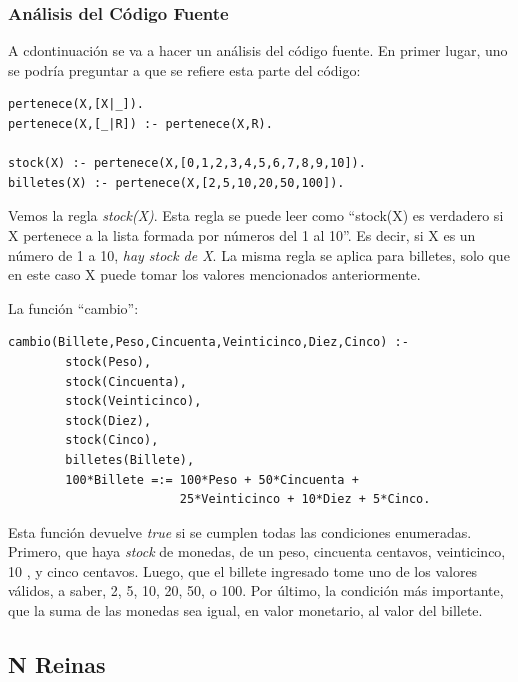 \documentclass[12pt,titlepage]{article}
\begin{document}
\subsubsection{Análisis del Código Fuente}

A cdontinuación se va a hacer un análisis del código fuente. En primer lugar, uno se podría preguntar a que se refiere esta parte del código:
\begin{lstlisting}
pertenece(X,[X|_]).
pertenece(X,[_|R]) :- pertenece(X,R).

stock(X) :- pertenece(X,[0,1,2,3,4,5,6,7,8,9,10]).
billetes(X) :- pertenece(X,[2,5,10,20,50,100]).
\end{lstlisting}

Vemos la regla \textit{stock(X)}. Esta regla se puede leer como ``stock(X) es verdadero si X pertenece a la lista formada por números del 1 al 10''. Es decir, si X es un número de 1 a 10, \textit{hay stock de X}. La misma regla se aplica para billetes, solo que en este caso X puede tomar los valores mencionados anteriormente.

La función ``cambio'':

\begin{lstlisting}
cambio(Billete,Peso,Cincuenta,Veinticinco,Diez,Cinco) :-
        stock(Peso),
        stock(Cincuenta),
        stock(Veinticinco),
        stock(Diez),
        stock(Cinco),
        billetes(Billete),
        100*Billete =:= 100*Peso + 50*Cincuenta + 
                        25*Veinticinco + 10*Diez + 5*Cinco.
\end{lstlisting}

Esta función devuelve \textit{true} si se cumplen todas las condiciones enumeradas. Primero, que haya \textit{stock} de monedas, de un peso, cincuenta centavos, veinticinco, 10 , y cinco centavos. Luego, que el billete ingresado tome uno de los valores válidos, a saber, 2, 5, 10, 20, 50, o 100. Por último, la condición más importante, que la suma de las monedas sea igual, en valor monetario, al valor del billete.

\subsection{N Reinas}
\end{document}

